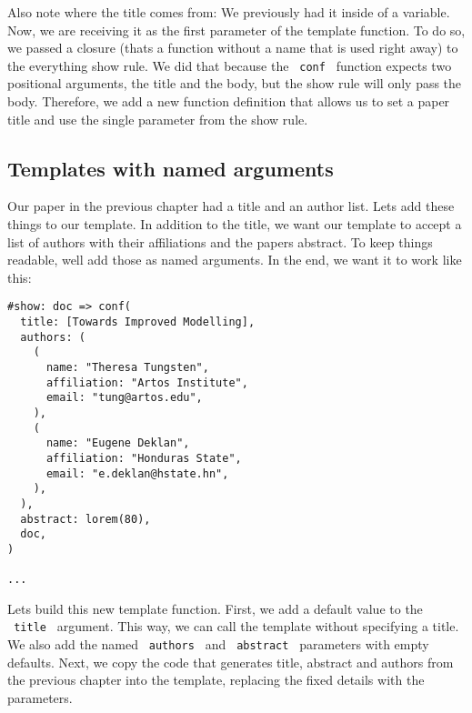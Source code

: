 Also note where the title comes from: We previously had it inside of a
variable. Now, we are receiving it as the first parameter of the
template function. To do so, we passed a closure (that\textquotesingle s
a function without a name that is used right away) to the everything
show rule. We did that because the \texttt{\ conf\ } function expects
two positional arguments, the title and the body, but the show rule will
only pass the body. Therefore, we add a new function definition that
allows us to set a paper title and use the single parameter from the
show rule.

\subsection{Templates with named arguments}\label{named-arguments}

Our paper in the previous chapter had a title and an author list.
Let\textquotesingle s add these things to our template. In addition to
the title, we want our template to accept a list of authors with their
affiliations and the paper\textquotesingle s abstract. To keep things
readable, we\textquotesingle ll add those as named arguments. In the
end, we want it to work like this:

\begin{verbatim}
#show: doc => conf(
  title: [Towards Improved Modelling],
  authors: (
    (
      name: "Theresa Tungsten",
      affiliation: "Artos Institute",
      email: "tung@artos.edu",
    ),
    (
      name: "Eugene Deklan",
      affiliation: "Honduras State",
      email: "e.deklan@hstate.hn",
    ),
  ),
  abstract: lorem(80),
  doc,
)

...
\end{verbatim}

Let\textquotesingle s build this new template function. First, we add a
default value to the \texttt{\ title\ } argument. This way, we can call
the template without specifying a title. We also add the named
\texttt{\ authors\ } and \texttt{\ abstract\ } parameters with empty
defaults. Next, we copy the code that generates title, abstract and
authors from the previous chapter into the template, replacing the fixed
details with the parameters.

